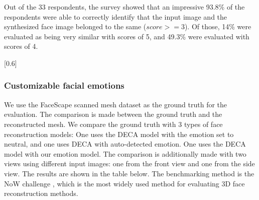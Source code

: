 Out of the 33 respondents, the survey showed that an impressive 93.8\% of the respondents were able to correctly identify that the input image and the synthesized face image belonged to the same  ($score >= 3$). Of those, 14\% were evaluated as being very similar with scores of 5, and 49.3\% were evaluated with scores of 4. %

[0.6]

\subsubsection{Customizable facial emotions}

We use the FaceScape scanned mesh dataset as the ground truth for the evaluation. The comparison is made between the ground truth and the reconstructed mesh. We compare the ground truth with 3 types of face reconstruction models: One uses the DECA model with the emotion set to neutral, and one uses DECA with auto-detected emotion. One uses the DECA model with our emotion model. The comparison is additionally made with two views using different input images: one from the front view and one from the side view. The results are shown in the table below. The benchmarking method is the NoW challenge \cite{RingNet:CVPR:2019}, which is the most widely used method for evaluating 3D face reconstruction methods.

